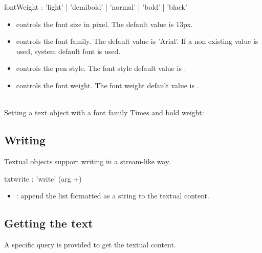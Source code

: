 \documentclass[a4paper,twoside]{report}
\newcommand{\subsublevel}[1]	{\subsection{#1}}
\begin{document}

\begin{rail}
	fontWeight : 'light' | 'demibold' | 'normal' | 'bold' | 'black'
\end{rail}

\begin{itemize}
\item {} controls the font size in pixel. The default value is 13px.
\item {} controls the font family. The default value is 'Arial'. If a non existing value is used, system default font is used.
\item {} controls the pen style. The font style default value is .\\
\item {} controls the font weight. The font weight default value is .
\end{itemize}

\example \\
Setting a text object with a font family Times and bold weight:

\subsublevel{Writing}
\label{txtwrite}
Textual objects support writing in a stream-like way.


\begin{rail}
txtwrite :  'write' (arg +)
\end{rail}

\begin{itemize}
\item {}: append the  list formatted as a string to the textual content.
\end{itemize}

\example 
{}


\subsublevel{Getting the text}
A specific  query is provided to get the textual content.

\example
{}
\end{document}
